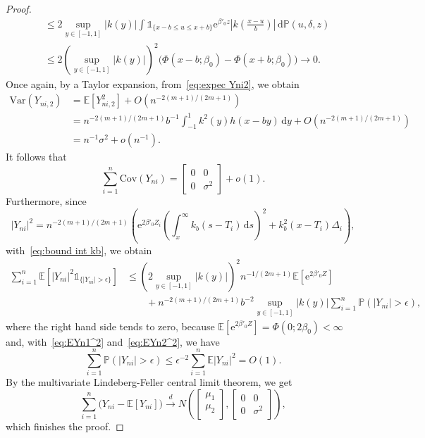 \documentclass[11pt,reqno]{amsart}
\theoremstyle{definition}
\theoremstyle{plain}
\theoremstyle{remark}
\begin{document}
\begin{proof}
\[\begin{split}
&\leq
2\sup_{y\in[-1,1]}|k(y)|
\int {\mathds{1}}_{\{x-b\leq u\leq x+b\}}
\mathrm{e}^{\beta'_0z}
\left|
k\left(\frac{x-u}{b}\right)
\right|\,\mathrm{d}{\mathbb{P}}(u,\delta,z)\\
&\leq
2\left(\sup_{y\in[-1,1]}|k(y)|\right)^2
\big( \Phi(x-b;\beta_0)-\Phi(x+b;\beta_0)\big)
\to 0.
\end{split}
\]
Once again, by a Taylor expansion, from~\eqref{eq:expec Yni2}, we obtain
\begin{equation}
\label{eq:EYn2^2}
\begin{split}
\text{Var}(Y_{ni,2})
&=
{\mathbb{E}}
\left[Y_{ni,2}^2\right]+O(n^{-2(m+1)/(2m+1)})\\
&=
n^{-2(m+1)/(2m+1)}b^{-1}
\int_{-1}^1 k^2(y)h(x-by)\,\mathrm{d}y+O(n^{-2(m+1)/(2m+1)})\\
&=
n^{-1}\sigma^2+o(n^{-1}).
\end{split}
\end{equation}
It follows that
\[
\sum_{i=1}^n
\mathrm{Cov}( Y_{ni})
=
\begin{bmatrix}
 0 & 0\\
 0 & \sigma^2
\end{bmatrix}+o(1).
\]
Furthermore, since
\[
|Y_{ni}|^2
=
n^{-2(m+1)/(2m+1)}\left(
\mathrm{e}^{2\beta'_0Z_i}
\left(\int_x^{\infty}k_b(s-T_i)\,\mathrm{d}s\right)^2
+
k^2_b(x-T_i)\Delta_i
\right),
\]
with~\eqref{eq:bound int kb}, we obtain
\[
\begin{split}
\sum_{i=1}^n
{\mathbb{E}}\left[|Y_{ni}|^2{\mathds{1}}_{\{|Y_{ni}|>\epsilon \}} \right]
&\leq
\left(2\sup_{y\in[-1,1]}|k(y)|\right)^2
n^{-1/(2m+1)}{\mathbb{E}}\left[\mathrm{e}^{2\beta'_0Z}\right]\\
&\qquad+
n^{-2(m+1)/(2m+1)}b^{-2}\sup_{y\in[-1,1]}|k(y)|
\sum_{i=1}^n{\mathbb{P}}\left(|Y_{ni}|>\epsilon\right),
\end{split}
\]
where the right hand side tends to zero, because ${\mathbb{E}}[\mathrm{e}^{2\beta'_0Z}]=\Phi(0;2\beta_0)<\infty$ and,  with~\eqref{eq:EYn1^2} and~\eqref{eq:EYn2^2},
we have
\[
\sum_{i=1}^n
{\mathbb{P}}\left(|Y_{ni}|>\epsilon\right)
\leq
\epsilon^{-2}
\sum_{i=1}^n
{\mathbb{E}}|Y_{ni}|^2
=
O(1).
\]
By the multivariate Lindeberg-Feller central limit theorem, we get
\[
\sum_{i=1}^n \big(Y_{ni}-{\mathbb{E}}\left[Y_{ni}\right]\big)
\stackrel{d}{\to}
N\left(\begin{bmatrix}
             \mu_1 \\
             \mu_2 \\
           \end{bmatrix},\begin{bmatrix}
0 & 0\\
0 & \sigma^2
\end{bmatrix}\right),
\]
which finishes the proof.
\end{proof}
\end{document}
